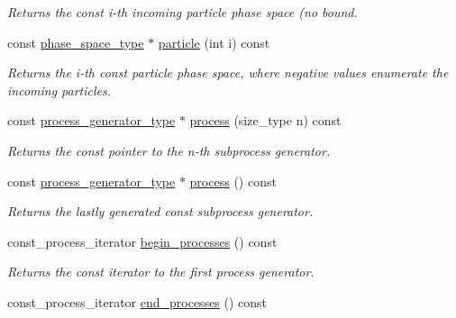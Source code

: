 \begin{DoxyCompactItemize}
\begin{DoxyCompactList}\small\item\em Returns the const i-\/th incoming particle phase space (no bound. \end{DoxyCompactList}\item 
const \hyperlink{a00400}{phase\-\_\-space\-\_\-type} $\ast$ \hyperlink{a00210_aad5633c6865f0dfed332a7ca31f36621}{particle} (int i) const 
\begin{DoxyCompactList}\small\item\em Returns the i-\/th const particle phase space, where negative values enumerate the incoming particles. \end{DoxyCompactList}\item 
\hypertarget{a00210_a32760ad5ec0d357e0086617c77e99566}{const \hyperlink{a00430}{process\-\_\-generator\-\_\-type} $\ast$ \hyperlink{a00210_a32760ad5ec0d357e0086617c77e99566}{process} (size\-\_\-type n) const }\label{a00210_a32760ad5ec0d357e0086617c77e99566}

\begin{DoxyCompactList}\small\item\em Returns the const pointer to the n-\/th subprocess generator. \end{DoxyCompactList}\item 
\hypertarget{a00210_af4976d6c9b846daf993c28a01c3ad32c}{const \hyperlink{a00430}{process\-\_\-generator\-\_\-type} $\ast$ \hyperlink{a00210_af4976d6c9b846daf993c28a01c3ad32c}{process} () const }\label{a00210_af4976d6c9b846daf993c28a01c3ad32c}

\begin{DoxyCompactList}\small\item\em Returns the lastly generated const subprocess generator. \end{DoxyCompactList}\item 
\hypertarget{a00210_a971bcc180427c97b86c065a52a5a3f6b}{const\-\_\-process\-\_\-iterator \hyperlink{a00210_a971bcc180427c97b86c065a52a5a3f6b}{begin\-\_\-processes} () const }\label{a00210_a971bcc180427c97b86c065a52a5a3f6b}

\begin{DoxyCompactList}\small\item\em Returns the const iterator to the first process generator. \end{DoxyCompactList}\item 
\hypertarget{a00210_a43676ce551f831ea4df4259cfcff05c4}{const\-\_\-process\-\_\-iterator \hyperlink{a00210_a43676ce551f831ea4df4259cfcff05c4}{end\-\_\-processes} () const }\label{a00210_a43676ce551f831ea4df4259cfcff05c4}


\end{DoxyCompactItemize}
